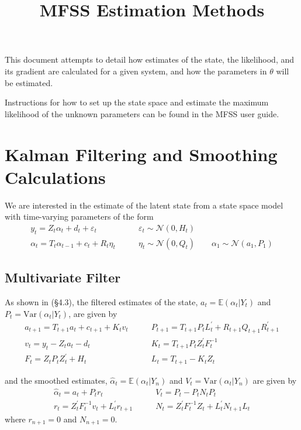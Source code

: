 \documentclass[12pt]{article}
\title{MFSS Estimation Methods}
\date{}
\author{}
\newcommand{\Var}[0]{\text{Var}}
\begin{document}
\maketitle

	This document attempts to detail how estimates of the state, the likelihood, and its gradient are calculated for a given system, and how the parameters in $\theta$ will be estimated.

	Instructions for how to set up the state space and estimate the maximum likelihood of the unknown parameters can be found in the MFSS user guide. 

\section{Kalman Filtering and Smoothing Calculations}

	We are interested in the estimate of the latent state from a state space model with time-varying parameters of the form
	\begin{align*} 
	y_t = Z_t \alpha_t + d_t + \varepsilon_t &\qquad \varepsilon_t \sim \mathcal{N}(0,H_t) \\ 
	\alpha_{t} = T_t \alpha_{t-1} + c_t + R_t \eta_t &\qquad \eta_t \sim \mathcal{N}(0, Q_t) \qquad
	\alpha_1 \sim \mathcal{N}(a_1, P_1) 
	\end{align*} 

\subsection{Multivariate Filter}
	As shown in \cite{dk_book} (\S 4.3), the filtered estimates of the state, $a_t = \mathbb{E}(\alpha_t | Y_t)$ and $P_t = \Var(\alpha_t | Y_t)$, are given by 
	\begin{align*}
	a_{t+1} = T_{t+1} a_t + c_{t+1} + K_t v_t &\qquad
	P_{t+1} = T_{t+1} P_t L_t^\prime + R_{t+1} Q_{t+1} R_{t+1}^\prime \\
	v_t = y_t - Z_ta_t - d_t &\qquad
	K_t = T_{t+1} P_t Z_t^\prime F_t^{-1} \\
	F_t = Z_t P_t Z_t^\prime + H_t &\qquad
	L_t = T_{t+1} - K_t Z_t 
	\end{align*} 

	and the smoothed estimates, $\hat{\alpha}_t = \mathbb{E}(\alpha_t | Y_n)$ and $V_t = \Var(\alpha_t | Y_n)$ are given by
	\begin{align*}
	\hat{\alpha}_t = a_t + P_t r_t &\qquad V_t = P_t - P_t N_t P_t \\ 
	r_t = Z_t^\prime F_t^{-1} v_t + L_t^\prime r_{t+1} &\qquad N_{t} = Z_t^\prime F_t^{-1} Z_t + L_t^\prime N_{t+1} L_t
	\end{align*}
	where $r_{n+1} = 0$ and $N_{n+1} = 0$. 
\end{document}
